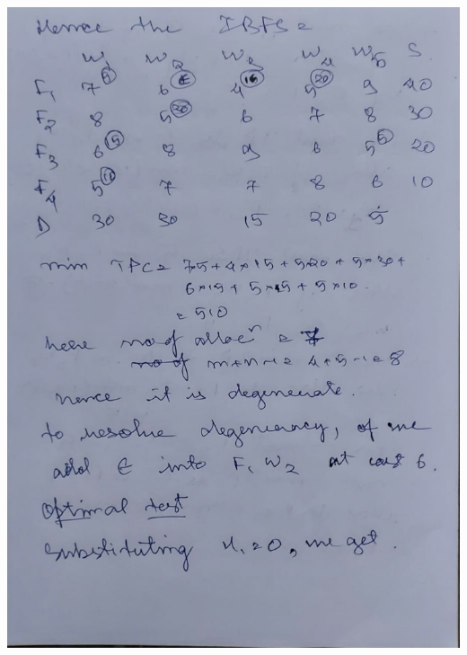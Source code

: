 \documentclass[12pt, letterpaper, twoside]{book}
\begin{document}
\includegraphics[width=\paperwidth, height=\paperheight]{Page22}
\end{document}
